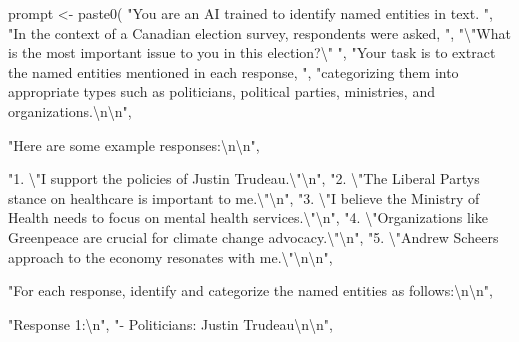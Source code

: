 \documentclass[
  authoryear,
  preprint,
  3p]{elsarticle}
\newenvironment{Shaded}{\begin{snugshade}}{\end{snugshade}}
\newcommand{\FunctionTok}[1]{\textcolor[rgb]{0.28,0.35,0.67}{#1}}
\newcommand{\NormalTok}[1]{\textcolor[rgb]{0.00,0.23,0.31}{#1}}
\newcommand{\OtherTok}[1]{\textcolor[rgb]{0.00,0.23,0.31}{#1}}
\newcommand{\SpecialCharTok}[1]{\textcolor[rgb]{0.37,0.37,0.37}{#1}}
\newcommand{\StringTok}[1]{\textcolor[rgb]{0.13,0.47,0.30}{#1}}
\begin{document}
\begin{Shaded}
\begin{Highlighting}[]
\NormalTok{prompt }\OtherTok{\textless{}{-}} \FunctionTok{paste0}\NormalTok{(}
    \StringTok{"You are an AI trained to identify named entities in text. "}\NormalTok{,}
    \StringTok{"In the context of a Canadian election survey, respondents were asked, "}\NormalTok{,}
    \StringTok{"}\SpecialCharTok{\textbackslash{}"}\StringTok{What is the most important issue to you in this election?}\SpecialCharTok{\textbackslash{}"}\StringTok{ "}\NormalTok{,}
    \StringTok{"Your task is to extract the named entities mentioned in each response, "}\NormalTok{,}
    \StringTok{"categorizing them into appropriate types such as politicians, political parties, ministries, and organizations.}\SpecialCharTok{\textbackslash{}n\textbackslash{}n}\StringTok{"}\NormalTok{,}
  
    \StringTok{"Here are some example responses:}\SpecialCharTok{\textbackslash{}n\textbackslash{}n}\StringTok{"}\NormalTok{,}
  
    \StringTok{"1. }\SpecialCharTok{\textbackslash{}"}\StringTok{I support the policies of Justin Trudeau.}\SpecialCharTok{\textbackslash{}"\textbackslash{}n}\StringTok{"}\NormalTok{,}
    \StringTok{"2. }\SpecialCharTok{\textbackslash{}"}\StringTok{The Liberal Party\textquotesingle{}s stance on healthcare is important to me.}\SpecialCharTok{\textbackslash{}"\textbackslash{}n}\StringTok{"}\NormalTok{,}
    \StringTok{"3. }\SpecialCharTok{\textbackslash{}"}\StringTok{I believe the Ministry of Health needs to focus on mental health services.}\SpecialCharTok{\textbackslash{}"\textbackslash{}n}\StringTok{"}\NormalTok{,}
    \StringTok{"4. }\SpecialCharTok{\textbackslash{}"}\StringTok{Organizations like Greenpeace are crucial for climate change advocacy.}\SpecialCharTok{\textbackslash{}"\textbackslash{}n}\StringTok{"}\NormalTok{,}
    \StringTok{"5. }\SpecialCharTok{\textbackslash{}"}\StringTok{Andrew Scheer\textquotesingle{}s approach to the economy resonates with me.}\SpecialCharTok{\textbackslash{}"\textbackslash{}n\textbackslash{}n}\StringTok{"}\NormalTok{,}
  
    \StringTok{"For each response, identify and categorize the named entities as follows:}\SpecialCharTok{\textbackslash{}n\textbackslash{}n}\StringTok{"}\NormalTok{,}
  
    \StringTok{"Response 1:}\SpecialCharTok{\textbackslash{}n}\StringTok{"}\NormalTok{,}
    \StringTok{"{-} Politicians: Justin Trudeau}\SpecialCharTok{\textbackslash{}n\textbackslash{}n}\StringTok{"}\NormalTok{,}
  

\end{Highlighting}
\end{Shaded}
\end{document}
